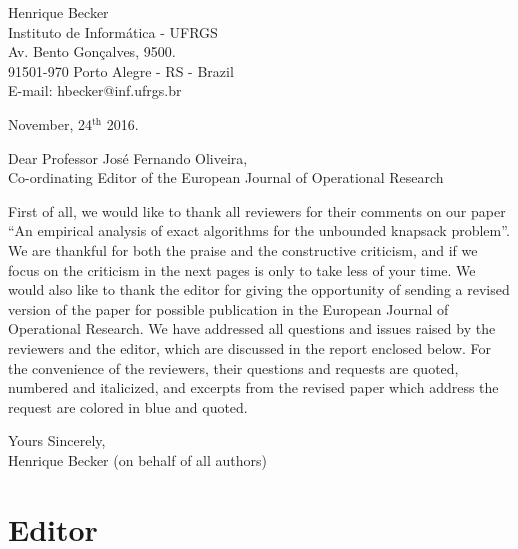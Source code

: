 \documentclass{elsarticle}
\begin{document}
\pagestyle{empty}

\vspace{2cm}

\begin{flushright}
   \begin{minipage}{7cm}
      Henrique Becker \\
      Instituto de Informática - UFRGS \\
      Av. Bento Gonçalves, 9500. \\
      91501-970 Porto Alegre - RS - Brazil \\
      E-mail: hbecker@inf.ufrgs.br \\
   \end{minipage}
\end{flushright}

\begin{flushleft}
November, 24$^{\text{th}}$ 2016.

\vspace{1.5cm}

Dear Professor José Fernando Oliveira, \\
Co-ordinating Editor of the European Journal of Operational Research
\end{flushleft}

\medskip
First of all, we would like to thank all reviewers for their comments on our paper ``An empirical analysis of exact algorithms for the unbounded knapsack problem''.
We are thankful for both the praise and the constructive criticism, and if we focus on the criticism in the next pages is only to take less of your time.
We would also like to thank the editor for giving the opportunity of sending a revised version of the paper for possible publication in the European Journal of Operational Research.
We have addressed all questions and issues raised by the reviewers and the editor, which are discussed in the report enclosed below.
For the convenience of the reviewers, their questions and requests are quoted, numbered and italicized, and excerpts from the revised paper which address the request are colored in blue and quoted.

\medskip

\begin{flushleft}
Yours Sincerely,\\
Henrique Becker (on behalf of all authors)
\end{flushleft}

\newpage

\section{Editor}
\end{document}
